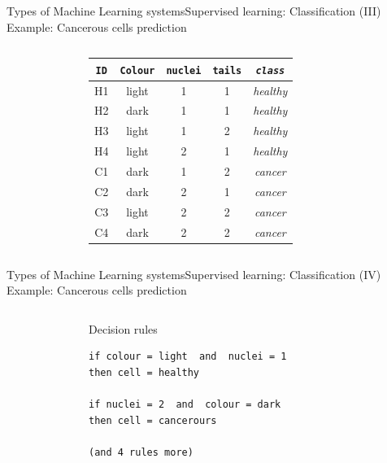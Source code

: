 \documentclass[10pt,compress]{beamer} %
\begin{document}
\begin{frame}{Types of Machine Learning systems}{Supervised learning: Classification (III)}
	Example: Cancerous cells prediction
	\begin{columns}
			\begin{figure}
			\centering{
			\resizebox{0.9\textwidth}{!}{}}
			\end{figure}


		\begin{center}
		\begin{tabular}{ccccc}\hline
		 \texttt{ID} & \texttt{Colour} & \texttt{nuclei}& \texttt{tails} & \texttt{\textit{class}} \\\hline
		 H1 & light  & 1     & 1     & \textit{healthy} \\
		 H2 & dark   & 1     & 1     & \textit{healthy} \\
		 H3 & light  & 1     & 2     & \textit{healthy} \\
		 H4 & light  & 2     & 1     & \textit{healthy} \\
		 C1 & dark   & 1     & 2     & \textit{cancer} \\
		 C2 & dark   & 2     & 1     & \textit{cancer} \\
		 C3 & light  & 2     & 2     & \textit{cancer} \\
		 C4 & dark   & 2     & 2     & \textit{cancer} \\
		 \hline
	 	\end{tabular}
	\end{center}
	\end{columns}
\end{frame}

\begin{frame}[fragile]{Types of Machine Learning systems}{Supervised learning: Classification (IV)}
	Example: Cancerous cells prediction
	\begin{columns}
 	   \column{.10\textwidth}
 	   \column{.20\textwidth}
			\begin{figure}
			\centering{
			\resizebox{0.9\textwidth}{!}{}}
			\end{figure}

 	   \column{.70\textwidth}
	   		\begin{exampleblock}{Decision rules}
	   		\begin{lstlisting}[firstnumber=1, xleftmargin=10pt] 
if colour = light  and  nuclei = 1 
then cell = healthy   	
			            
if nuclei = 2  and  colour = dark
then cell = cancerours

(and 4 rules more)
          \end{lstlisting}
	   		\end{exampleblock}
	\end{columns}
\end{frame}
\end{document}
